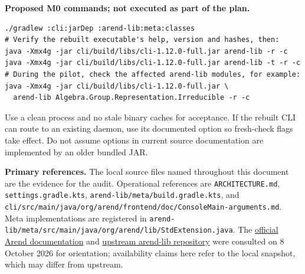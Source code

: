 \documentclass[11pt,a4paper]{article}
\newcommand{\code}[1]{\texttt{\detokenize{#1}}}
\newcommand{\src}[1]{{\footnotesize\nolinkurl{#1}}}
\begin{document}
\textbf{Proposed M0 commands; not executed as part of the plan.}
\begin{lstlisting}
./gradlew :cli:jarDep :arend-lib:meta:classes
# Verify the rebuilt executable's help, version and hashes, then:
java -Xmx4g -jar cli/build/libs/cli-1.12.0-full.jar arend-lib -r -c
java -Xmx4g -jar cli/build/libs/cli-1.12.0-full.jar arend-lib -t -r -c
# During the pilot, check the affected arend-lib modules, for example:
java -Xmx4g -jar cli/build/libs/cli-1.12.0-full.jar \
  arend-lib Algebra.Group.Representation.Irreducible -r -c
\end{lstlisting}
Use a clean process and no stale binary caches for acceptance. If the rebuilt
CLI can route to an existing daemon, use its documented \code{--no-daemon}
option so fresh-check flags take effect. Do not assume options in current
source documentation are implemented by an older bundled JAR.

\textbf{Primary references.} The local source files named throughout this
document are the evidence for the audit. Operational references are
\src{ARCHITECTURE.md}, \src{settings.gradle.kts},
\src{arend-lib/meta/build.gradle.kts}, and
\src{cli/src/main/java/org/arend/frontend/doc/ConsoleMain-arguments.md}.
Meta implementations are registered in
\src{arend-lib/meta/src/main/java/org/arend/lib/StdExtension.java}.
The \href{https://arend-lang.github.io/documentation/}{official Arend documentation}
and \href{https://github.com/JetBrains/arend-lib}{upstream arend-lib repository}
were consulted on 8 October 2026 for orientation; availability claims here
refer to the local snapshot, which may differ from upstream.
\end{document}
